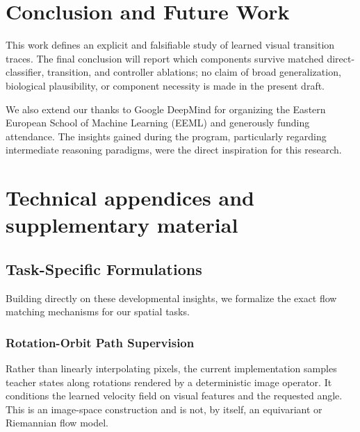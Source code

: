 \documentclass{article}
\begin{document}
\section{Conclusion and Future Work}
This work defines an explicit and falsifiable study of learned visual transition traces. The final conclusion will report which components survive matched direct-classifier, transition, and controller ablations; no claim of broad generalization, biological plausibility, or component necessity is made in the present draft.

\begin{ack}
We also extend our thanks to Google DeepMind for organizing the Eastern European School of Machine Learning (EEML) and generously funding attendance. The insights gained during the program, particularly regarding intermediate reasoning paradigms, were the direct inspiration for this research.
\end{ack}




\appendix

\section{Technical appendices and supplementary material}
\subsection{Task-Specific Formulations}

Building directly on these developmental insights, we formalize the exact flow matching mechanisms for our spatial tasks.

\subsubsection{Rotation-Orbit Path Supervision}
Rather than linearly interpolating pixels, the current implementation samples teacher states along rotations rendered by a deterministic image operator. It conditions the learned velocity field on visual features and the requested angle. This is an image-space construction and is not, by itself, an equivariant or Riemannian flow model.
\end{document}
